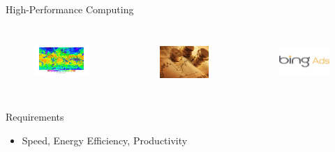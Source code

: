 \begin{frame}{High-Performance Computing}
  \begin{columns}
    \begin{figure}[ht]
      \centering
      \includegraphics[scale=0.4, clip=true, trim=50 50 50 0]{figs/weather-forecasting.jpg}\\
    \end{figure}
    \begin{figure}[ht]
      \centering
      \includegraphics[scale=0.29, clip=true, trim=0 20 0 20]{figs/finance.jpg}\\
    \end{figure}
    \begin{figure}[ht]
      \centering
      \includegraphics[scale=0.25]{figs/ads.jpg}\\
    \end{figure}
  \end{columns}
  \vspace{0.5cm}

  \begin{beamerboxesrounded}{Requirements}
    \begin{itemize}
    \item Speed, Energy Efficiency, Productivity
    \end{itemize}
  \end{beamerboxesrounded}
  \vspace{0.5cm}


\end{frame}
